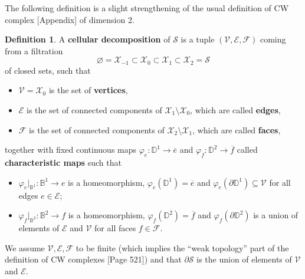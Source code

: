 \documentclass[11pt,reqno]{amsart}
\theoremstyle{plain}
\theoremstyle{definition}
\newtheorem{definition}[subsection]{Definition}
\theoremstyle{remark}
\numberwithin{equation}{subsection}
\newcommand*{\bbB}{\mathbb{B}}
\newcommand*{\bbD}{\mathbb{D}}
\newcommand*{\calE}{\mathcal{E}}
\newcommand*{\calF}{\mathcal{F}}
\newcommand*{\calS}{\mathcal{S}}
\newcommand*{\calV}{\mathcal{V}}
\newcommand*{\calX}{\mathcal{X}}
\begin{document}
The following definition is a slight strengthening of the usual definition of CW complex \cite{hatcher2002algebraic}[Appendix] of dimension 2.

\begin{definition}
    A \textbf{cellular decomposition} of $\calS$ is a tuple $(\calV,\calE,\calF)$ coming from a filtration
    \[\varnothing=\calX_{-1}\subset\calX_0\subset\calX_1\subset\calX_2=\calS\]
    of closed sets, such that
    \begin{itemize}
        \item $\calV=\calX_0$ is the set of \textbf{vertices},
        \item $\calE$ is the set of connected components of $\calX_1\setminus\calX_0$, which are called \textbf{edges},
        \item $\calF$ is the set of connected components of $\calX_2\setminus\calX_1$, which are called \textbf{faces},
    \end{itemize}
    together with fixed continuous maps $\varphi_e\colon\bbD^1\to\overline{e}$ and $\varphi_f\colon\bbD^2\to\overline{f}$ called \textbf{characteristic maps} such that
    \begin{itemize}
        \item $\varphi_e|_{\bbB^1}\colon \bbB^1\to e$ is a homeomorphism, $\varphi_e(\bbD^1)=\overline{e}$ and $\varphi_e(\partial \bbD^1)\subseteq\calV$ for all edges $e\in\calE$;
        \item $\varphi_f|_{\bbB^2}\colon \bbB^2\to f$ is a homeomorphism, $\varphi_f(\bbD^2)=\overline{f}$ and $\varphi_f(\partial \bbD^2)$ is a union of elements of $\calE$ and $\calV$ for all faces $f\in\calF$.
    \end{itemize}
    We assume $\calV,\calE,\calF$ to be finite (which implies the ``weak topology'' part of the definition of CW complexes \cite{hatcher2002algebraic}[Page 521]) and that $\partial\calS$ is the union of elements of $\calV$ and $\calE$.
    

\end{definition}
\end{document}
